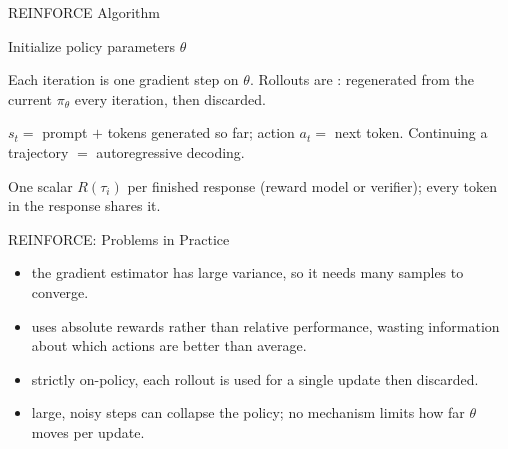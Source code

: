 \begin{frame}{REINFORCE Algorithm}
  \begin{algorithm}[H]
  \small
  \caption{REINFORCE}
  Initialize policy parameters $\theta$\;
  \end{algorithm}

  \vspace{0.3em}
  \begin{description}[nosep]
    \item[Outer loop $k$:] Each iteration is one gradient step on $\theta$. Rollouts are : regenerated from the current $\pi_\theta$ every iteration, then discarded.
    \item[State / action:] $s_t = $ prompt $+$ tokens generated so far; action $a_t = $ next token. Continuing a trajectory $=$ autoregressive decoding.
    \item[Reward:] One scalar $R(\tau_i)$ per finished response (reward model or verifier); every token in the response shares it.
  \end{description}
\end{frame}

\begin{frame}{REINFORCE: Problems in Practice}
  \begin{itemize}[nosep]
    \item {} the gradient estimator has large variance, so it needs many samples to converge.
    \item {} uses absolute rewards rather than relative performance, wasting information about which actions are better than average.
    \item {} strictly on-policy, each rollout is used for a single update then discarded.
    \item {} large, noisy steps can collapse the policy; no mechanism limits how far $\theta$ moves per update.
  \end{itemize}
\end{frame}


